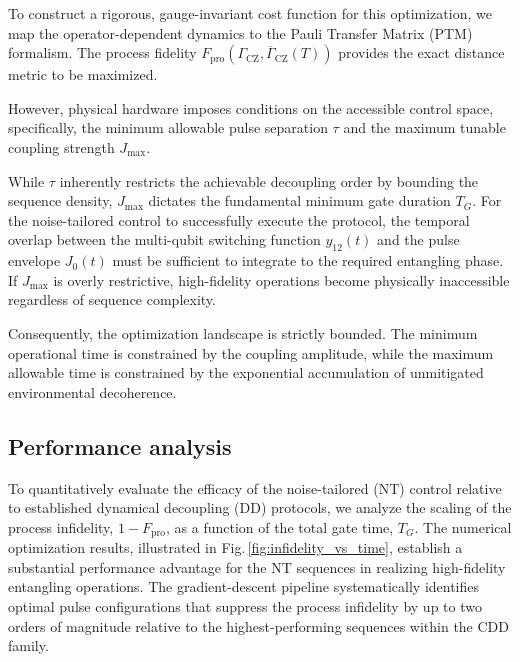 \documentclass[%
 reprint,
superscriptaddress,
 amsmath,amssymb,
 aps,
pra,
]{revtex4-2}
\newcommand{\qk}[1]{{\color{OliveGreen}#1}}
\begin{document}
To construct a rigorous, gauge-invariant cost function for this optimization, we map the operator-dependent dynamics to the Pauli Transfer Matrix (PTM) formalism. The process fidelity $F_{\text{pro}}(\Gamma_{\text{CZ}}, \overline{\Gamma}_{\text{CZ}}(T))$ provides the exact distance metric to be maximized.

However, physical hardware imposes conditions on the accessible control space, specifically, the minimum allowable pulse separation $\tau$ and the maximum tunable coupling strength $J_{\text{max}}$. 

While $\tau$ inherently restricts the achievable decoupling order by bounding the sequence density, $J_{\text{max}}$ dictates the fundamental minimum gate duration $T_G$. For the noise-tailored control to successfully execute the protocol, the temporal overlap between the multi-qubit switching function $y_{12}(t)$ and the pulse envelope $J_0(t)$ must be sufficient to integrate to the required entangling phase. If $J_{\text{max}}$ is overly restrictive, high-fidelity operations become physically inaccessible regardless of sequence complexity. 

Consequently, the optimization landscape is strictly bounded. The minimum operational time is constrained by the coupling amplitude, while the maximum allowable time is constrained by the exponential accumulation of unmitigated environmental decoherence.


\subsection{Performance analysis}

To quantitatively evaluate the efficacy of the noise-tailored (NT) control relative to established dynamical decoupling (DD) protocols, we analyze the scaling of the process infidelity, $1 - F_{\text{pro}}$, as a function of the total gate time, $T_G$. The numerical optimization results, illustrated in Fig.\,\ref{fig:infidelity_vs_time}, establish a substantial performance advantage for the NT sequences in realizing high-fidelity entangling operations. The gradient-descent pipeline systematically identifies optimal pulse configurations that suppress the process infidelity by up to two orders of magnitude relative to the highest-performing sequences within the CDD family.
\end{document}
